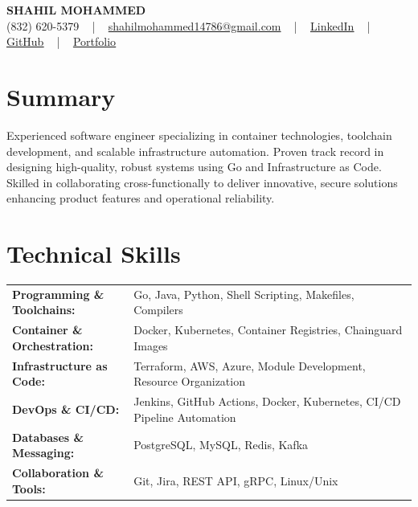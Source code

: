 \documentclass[letterpaper,11pt]{article}
\begin{document}
\begin{center}
    {\fontsize{14pt}{12pt}\selectfont \textbf{\MakeUppercase{Shahil Mohammed}}}\\ \vspace{2pt}
    \fontsize{10pt}{12pt}\selectfont (832) 620-5379 ~ | ~ \href{mailto:shahilmohammed14786@gmail.com}{shahilmohammed14786@gmail.com} ~ | ~  
    \href{https://www.linkedin.com/in/shahil-mohammed-9652931a1/}{\color{blue}\underline{LinkedIn}}  ~ | ~ 
    \href{https://github.com/freakbeast14}{\color{blue}\underline{GitHub}} ~ | ~ 
    \href{https://shahil-mohammed.netlify.app/}{\color{blue}\underline{Portfolio}}
    \vspace{-8pt}
\end{center}

\section{Summary}
\fontsize{9pt}{10pt}\selectfont
Experienced software engineer specializing in container technologies, toolchain development, and scalable infrastructure automation. Proven track record in designing high-quality, robust systems using Go and Infrastructure as Code. Skilled in collaborating cross-functionally to deliver innovative, secure solutions enhancing product features and operational reliability.
 \vspace{-5pt}
 
\section{Technical Skills}
        \vspace{-14pt}
        \begin{table}[h]
            \fontsize{9pt}{10pt}\selectfont
            \begin{tabular}{p{0.3\linewidth} p{0.7\linewidth}}
                \textbf{Programming \& Toolchains:} & Go, Java, Python, Shell Scripting, Makefiles, Compilers \\
                \textbf{Container \& Orchestration:} & Docker, Kubernetes, Container Registries, Chainguard Images \\
                \textbf{Infrastructure as Code:} & Terraform, AWS, Azure, Module Development, Resource Organization \\
                \textbf{DevOps \& CI/CD:} & Jenkins, GitHub Actions, Docker, Kubernetes, CI/CD Pipeline Automation \\
                \textbf{Databases \& Messaging:} & PostgreSQL, MySQL, Redis, Kafka \\
                \textbf{Collaboration \& Tools:} & Git, Jira, REST API, gRPC, Linux/Unix \\
            \end{tabular}
        \end{table}
 \vspace{-15pt}
 
\end{document}
